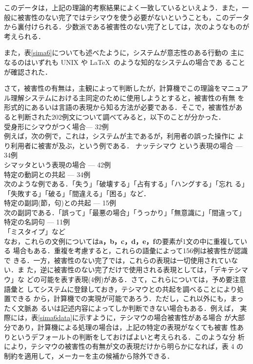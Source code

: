 {このデータは，上記の理論的考察結果によく一致しているといえよう．また，一
般に被害性のない完了ではテシマウを使う必要がないということも，このデータ
から裏付けられる．少数派である被害性のない完了としては，次のようなものが
考えられる．



また，表\ref{sima6}についても述べたように，システムが意志性のある行動の
{\dg 主}になるのはいずれも UNIX や \LaTeX\ のような知的なシステムの場合であ
ることが確認された．

さて，被害性の有無は，主観によって判断したが，計算機でこの理論をマニュア
ル理解システムにおける{\dg 主}同定のために使用しようとすると，被害性の有無
を形式的にあるいは言語の表現から知る方法が必要である．そこで，被害性があ
ると判断された202例文について調べてみると，以下のことが分かった．\\

 受身形にシマウがつく場合--- 32例\\
例えば，次の例で，これは，システムが{\dg 主}であるが，利用者の誤った操作に
より利用者に被害が及ぶ，という例である．
ナッテシマウ という表現の場合 --- 34例\\
シマッタという表現の場合 --- 42例\\
特定の動詞との共起 --- 34例\\
次のような例である．「失う」「破壊する」「占有する」「ハングする」「忘れ
る」「失敗する」「破る」「間違える」「困る」など．\\
特定の副詞(節，句)との共起 --- 15例\\
次の副詞である．「誤って」「最悪の場合」「うっかり」「無意識に」「間違って」\\
特定の名詞句 --- 11例\\
「ミスタイプ」など\\

なお，これらの文例については{\bf a，b，c，d，e，f}の要素が1文の中に重複している
場合もある．重複を考慮すると，これらの語彙によって156例は被害性が認識で
きる．一方，被害性のない完了では，これらの表現は一切使用されていない．ま
た，逆に被害性のない完了だけで使用される表現としては，「デキテシマウ」な
どの可能を表す表現(4例)がある．さて，これらについては，予め要注意語彙と
してシステムに登録しておき，テシマウとの共起を調べることにより処置できる
から，計算機での実現が可能であろう．ただし，これ以外にも，まったく文脈あ
るいは記述内容によってしか判断できない場合もある．例えば，
実際には，表\ref{sima6data}に示すように，テシマウの場合被害性がある場合
が大部分であり，計算機による処理の場合は，上記の特定の表現がなくても被害
性ありというデフォールトの判断をしておけばよいと考えられる．このような分
析により，テシマウの被害性の有無が文の表現だけから明らかになれば，表
4 の制約を適用して，メーカーを{\dg 主}の候補から除外できる．

}
